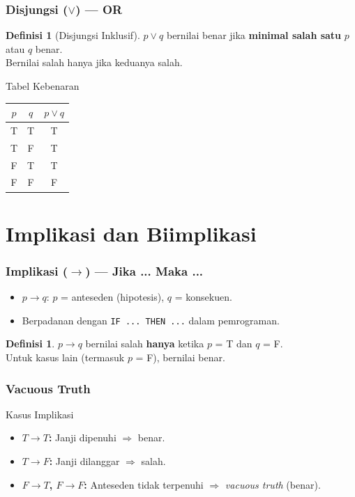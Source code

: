 \documentclass[handout]{beamer}
\theoremstyle{definition}
\newtheorem{definisi}[theorem]{Definisi}
\theoremstyle{example}
\begin{document}
\begin{frame}
\frametitle{Disjungsi ($\vee$) --- OR}
\begin{definisi}[Disjungsi Inklusif]
$p \vee q$ bernilai benar jika \textbf{minimal salah satu} $p$ atau $q$ benar.\\
Bernilai salah hanya jika keduanya salah.
\end{definisi}
\begin{block}{Tabel Kebenaran}
\begin{tabular}{|c|c|c|}
\hline
$p$ & $q$ & $p \vee q$ \\ \hline
T & T & T \\ \hline
T & F & T \\ \hline
F & T & T \\ \hline
F & F & F \\ \hline
\end{tabular}
\end{block}
\end{frame}

\section{Implikasi dan Biimplikasi}

\begin{frame}
\frametitle{Implikasi ($\rightarrow$) --- Jika ... Maka ...}
\begin{itemize}
  \item $p \rightarrow q$: $p$ = anteseden (hipotesis), $q$ = konsekuen.
  \item Berpadanan dengan \texttt{IF ... THEN ...} dalam pemrograman.
\end{itemize}
\begin{definisi}
$p \rightarrow q$ bernilai salah \textbf{hanya} ketika $p$ = T dan $q$ = F.\\
Untuk kasus lain (termasuk $p$ = F), bernilai benar.
\end{definisi}
\end{frame}

\begin{frame}
\frametitle{Vacuous Truth}
\begin{block}{Kasus Implikasi}
\begin{itemize}
  \item \textbf{$T \rightarrow T$:} Janji dipenuhi $\Rightarrow$ benar.
  \item \textbf{$T \rightarrow F$:} Janji dilanggar $\Rightarrow$ salah.
  \item \textbf{$F \rightarrow T$, $F \rightarrow F$:} Anteseden tidak terpenuhi $\Rightarrow$ \textit{vacuous truth} (benar).
\end{itemize}
\end{block}
\end{frame}
\end{document}

